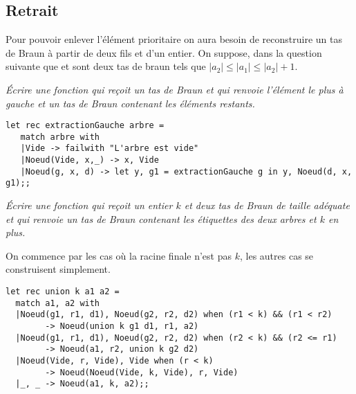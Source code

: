 \subsection*{Retrait}
Pour pouvoir enlever l'élément prioritaire on aura besoin de reconstruire un tas de Braun à partir de deux fils et d'un entier. On suppose, dans la question suivante que  et  sont deux tas de braun tels que $|a_2| \le |a_1| \le |a_2|+1$.
\begin{Exercise}[title = Enlever un élément]\it 
Écrire une fonction  qui reçoit un tas de Braun et qui renvoie l'élément le plus à gauche et un tas de Braun contenant les éléments restants.
\end{Exercise}
\begin{Answer}
\begin{lstlisting}
let rec extractionGauche arbre = 
   match arbre with
   |Vide -> failwith "L'arbre est vide"
   |Noeud(Vide, x,_) -> x, Vide
   |Noeud(g, x, d) -> let y, g1 = extractionGauche g in y, Noeud(d, x, g1);;
\end{lstlisting}
\end{Answer}
\begin{Exercise}[title = Reconstitution]\it 
Écrire une fonction  qui reçoit un entier $k$ et deux tas de Braun de taille adéquate et qui renvoie un tas de Braun contenant les étiquettes des deux arbres et $k$ en plus.
\end{Exercise}
\begin{Answer} On commence par les cas où la racine finale n'est pas $k$, les autres cas se construisent simplement.
\begin{lstlisting}
let rec union k a1 a2 =
  match a1, a2 with
  |Noeud(g1, r1, d1), Noeud(g2, r2, d2) when (r1 < k) && (r1 < r2) 
        -> Noeud(union k g1 d1, r1, a2)
  |Noeud(g1, r1, d1), Noeud(g2, r2, d2) when (r2 < k) && (r2 <= r1) 
        -> Noeud(a1, r2, union k g2 d2)
  |Noeud(Vide, r, Vide), Vide when (r < k)
        -> Noeud(Noeud(Vide, k, Vide), r, Vide)
  |_, _ -> Noeud(a1, k, a2);;
\end{lstlisting}
\end{Answer}
